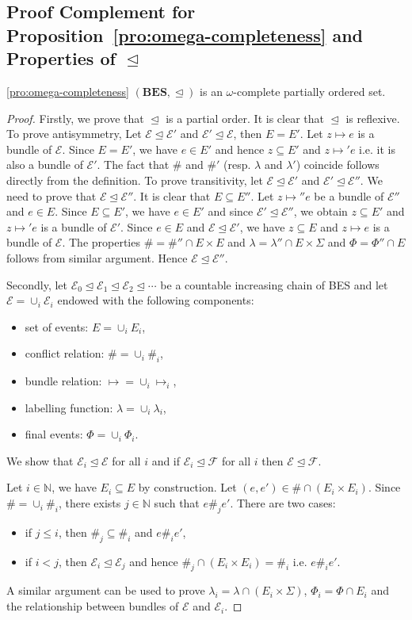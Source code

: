 \documentclass{llncs}
\newcommand{\BES}{\mathbf{BES}}
\newcommand{\N}{\mathbb{N}}
\newcommand{\EE}{\mathcal{E}}
\newcommand{\FF}{\mathcal{F}}
\newcommand{\prefix}{\trianglelefteq}
\newcommand{\<}{\langle}
\renewcommand{\>}{\rangle}
\newcommand{\exit}{\Phi}
\begin{document}
\subsection{Proof Complement for Proposition~\ref{pro:omega-completeness} and Properties of $\prefix$}

\begin{repproposition}{\ref{pro:omega-completeness}}
$(\BES,\prefix)$ is an $\omega$-complete partially ordered set.
\end{repproposition}

\begin{proof}
Firstly, we prove that $\prefix$ is a partial order. It is clear that $\prefix$ is reflexive. To prove antisymmetry, Let $\EE\prefix\EE'$ and $\EE'\prefix\EE$, then $E = E'$. Let $z\mapsto e$ is a bundle of $\EE$. Since $E = E'$, we have $e\in E'$ and hence $z\subseteq E'$ and $z\mapsto' e$ i.e. it is also a bundle of $\EE'$. The fact that $\#$ and $\#'$ (resp. $\lambda$ and $\lambda'$) coincide follows directly from the definition. To prove transitivity, let $\EE\prefix\EE'$ and $\EE'\prefix\EE''$. We need to prove that $\EE\prefix\EE''$. It is clear that $E\subseteq E''$. Let  $z\mapsto'' e$ be a bundle of $\EE''$ and $e\in E$. Since $E\subseteq E'$, we have $e\in E'$ and since $\EE'\prefix\EE''$, we obtain $z\subseteq E'$ and $z\mapsto' e$ is a bundle of $\EE'$. Since $e\in E$ and $\EE\prefix \EE'$, we have $z\subseteq E$ and $z\mapsto e$ is a bundle of $\EE$. The properties $\# = \#''\cap E\times E$ and $\lambda = \lambda''\cap E\times\Sigma$ and $\exit = \exit''\cap E$ follows from similar argument. Hence $\EE\prefix\EE''$.

Secondly, let $\EE_0\prefix\EE_1\prefix\EE_2\prefix\cdots$ be a countable increasing chain of BES and let $\EE = \cup_i\EE_i$ endowed with the following components:
\begin{itemize}
\item set of events: $E = \cup_i E_i$,
\item conflict relation: $\# = \cup_i\#_i$,
\item bundle relation: $\mapsto = \cup_i\mapsto_i$,
\item labelling function: $\lambda = \cup_i\lambda_i$,
\item final events: $\exit = \cup_i\exit_i$.
\end{itemize}
We show that $\EE_i\prefix\EE$ for all $i$ and if $\EE_i\prefix\FF$ for all $i$ then $\EE\prefix\FF$.

Let $i\in\N$, we have $E_i\subseteq E$ by construction. Let $(e,e')\in\#\cap (E_i\times E_i)$. Since $\# = \cup_i\#_i$, there exists $j\in\N$ such that $e\#_je'$. There are two cases:
\begin{itemize}
\item if $j\leq i$, then $\#_j\subseteq\#_i$ and $e\#_ie'$,
\item if $i<j$, then $\EE_i\prefix \EE_j$ and hence $\#_j\cap(E_i\times E_i) = \#_i$ i.e. $e\#_i e'$.
\end{itemize}
A similar argument can be used to prove $\lambda_i = \lambda\cap(E_i\times\Sigma)$, $\exit_i = \exit \cap{E_i}$ and the relationship between bundles of $\EE$ and $\EE_i$.


\end{proof}
\end{document}
